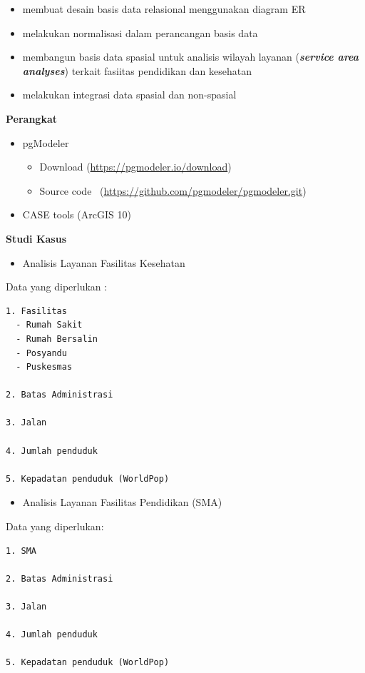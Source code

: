 \documentclass[]{book}
\providecommand{\tightlist}{%
  \setlength{\itemsep}{0pt}\setlength{\parskip}{0pt}}
\begin{document}
\begin{itemize}
\tightlist
\item
  membuat desain basis data relasional menggunakan diagram ER
\item
  melakukan normalisasi dalam perancangan basis data
\item
  membangun basis data spasial untuk analisis wilayah layanan (\emph{\textbf{service area analyses}}) terkait fasiitas pendidikan dan kesehatan
\item
  melakukan integrasi data spasial dan non-spasial
\end{itemize}

\textbf{Perangkat}

\begin{itemize}
\tightlist
\item
  pgModeler

  \begin{itemize}
  \tightlist
  \item
    Download (\url{https://pgmodeler.io/download})
  \item
    Source code ~(\url{https://github.com/pgmodeler/pgmodeler.git})
  \end{itemize}
\item
  CASE tools (ArcGIS 10)
\end{itemize}

\textbf{Studi Kasus}

\begin{itemize}
\tightlist
\item
  Analisis Layanan Fasilitas Kesehatan
\end{itemize}

Data yang diperlukan :

\begin{verbatim}
1. Fasilitas 
  - Rumah Sakit
  - Rumah Bersalin
  - Posyandu
  - Puskesmas

2. Batas Administrasi

3. Jalan

4. Jumlah penduduk

5. Kepadatan penduduk (WorldPop)
\end{verbatim}

\begin{itemize}
\tightlist
\item
  Analisis Layanan Fasilitas Pendidikan (SMA)
\end{itemize}

Data yang diperlukan:

\begin{verbatim}
1. SMA

2. Batas Administrasi

3. Jalan

4. Jumlah penduduk

5. Kepadatan penduduk (WorldPop)
\end{verbatim}
\end{document}
